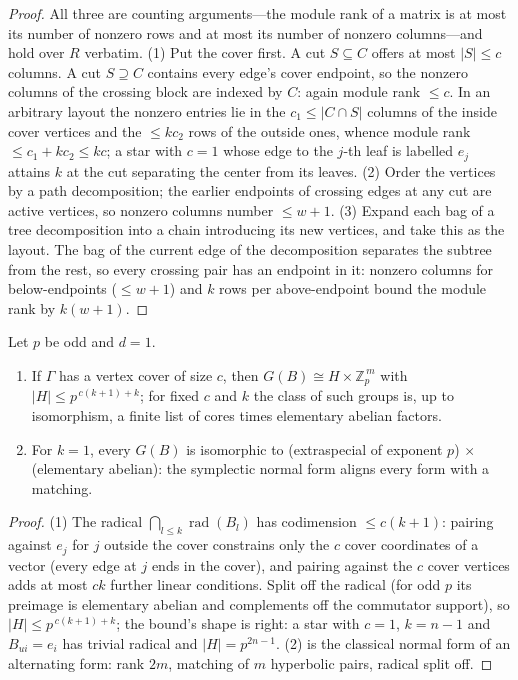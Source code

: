 \documentclass[a4paper,UKenglish,autoref,anonymous]{lipics-v2021}
\newcommand{\Zp}{\mathbb{Z}_p}
\newcommand{\R}{R}                                   %
\begin{document}
\begin{proof}
All three are counting arguments---the module rank of a matrix is at
most its number of nonzero rows and at most its number of nonzero
columns---and hold over $\R$ verbatim. (1) Put the cover first. A cut $S
\subseteq C$ offers at most $|S| \le c$ columns. A cut $S \supseteq C$
contains every edge's cover endpoint, so the nonzero columns of the
crossing block are indexed by $C$: again module rank $\le c$. In an
arbitrary layout the nonzero entries lie in the $c_1 \le |C \cap S|$
columns of the inside cover vertices and the $\le k c_2$ rows of the
outside ones, whence module rank $\le c_1 + k c_2 \le kc$; a star with
$c = 1$ whose edge to the $j$-th leaf is labelled $e_j$ attains $k$ at
the cut separating the center from its leaves. (2) Order the vertices by
a path decomposition; the earlier endpoints of crossing edges at any cut
are active vertices, so nonzero columns number $\le w + 1$. (3) Expand
each bag of a tree decomposition into a chain introducing its new
vertices, and take this as the layout. The bag of the current edge of
the decomposition separates the subtree from the rest, so every
crossing pair has an endpoint in it: nonzero columns for
below-endpoints ($\le w+1$) and $k$ rows per above-endpoint bound the
module rank by $k(w+1)$.
\end{proof}

\begin{proposition}
\label{prop:collapse}
Let $p$ be odd and $d = 1$.
\begin{enumerate}
\item If $\Gamma$ has a vertex cover of size $c$, then $G(B) \cong H
  \times \Zp^{\,m}$ with $|H| \le p^{\,c(k+1) + k}$; for fixed $c$ and
  $k$ the class of such groups is, up to isomorphism, a finite list of
  cores times elementary abelian factors.
\item For $k = 1$, every $G(B)$ is isomorphic to (extraspecial of
  exponent $p$) $\times$ (elementary abelian): the symplectic normal
  form aligns every form with a matching.
\end{enumerate}
\end{proposition}

\begin{proof}
(1) The radical $\bigcap_{l \le k} \operatorname{rad}(B_l)$ has
codimension $\le c(k+1)$: pairing against $e_j$ for $j$ outside the
cover constrains only the $c$ cover coordinates of a vector (every edge
at $j$ ends in the cover), and pairing against the $c$ cover vertices
adds at most $ck$ further linear conditions. Split off the radical (for
odd $p$ its preimage is elementary abelian and complements off the
commutator support), so $|H| \le p^{\,c(k+1)+k}$; the bound's shape is
right: a star with $c = 1$, $k = n - 1$ and $B_{ui} = e_i$ has trivial
radical and $|H| = p^{2n-1}$. (2) is the classical normal form of an
alternating form: rank $2m$, matching of $m$ hyperbolic pairs, radical
split off.
\end{proof}
\end{document}
